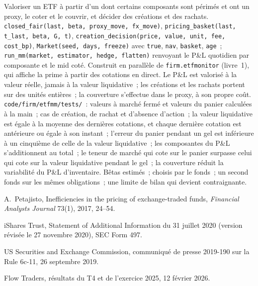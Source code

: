 \begin{build}
 Valoriser un ETF à partir d'un  dont certains composants sont périmés et ont un proxy, le coter et le couvrir, et décider des créations et des rachats.
 \texttt{closed\_fair(last, beta, proxy\_move, fx\_move)}, \texttt{pricing\_basket(last, t\_last, beta, G, t)},
\texttt{creation\_decision(price, value, unit, fee, cost\_bp)}, \texttt{Market(seed, days, freeze)} avec \texttt{true}, \texttt{nav},
\texttt{basket}, \texttt{age}~; \texttt{run\_mm(market, estimator, hedge, flatten)} renvoyant le P\&L quotidien par composante et le mid coté. Construit
en parallèle de \texttt{firm.etfmonitor} (livre~1), qui affiche la prime à partir des cotations en direct.
 Le P\&L est valorisé à la valeur réelle, jamais à la valeur liquidative~; les créations et les rachats portent sur des unités entières~; la couverture s'effectue dans le
proxy, à son propre coût.
 \texttt{code/firm/etfmm/tests/}~: valeurs à marché fermé et valeurs du panier calculées à la main~; cas de création, de rachat et d'absence d'action~; la valeur liquidative
est égale à la moyenne des dernières cotations, et chaque dernière cotation est antérieure ou égale à son instant~; l'erreur du panier pendant un gel est inférieure à un cinquième de celle de la
valeur liquidative~; les composantes du P\&L s'additionnent au total~; le teneur de marché qui cote sur le panier surpasse celui qui cote sur la valeur liquidative pendant le gel~; la couverture réduit la
variabilité du P\&L d'inventaire.
 Bêtas estimés~;  choisis par le fonds~; un second fonds sur les mêmes obligations~; une limite de bilan qui devient contraignante.
\end{build}

\begin{omsources}
\item A.~Petajisto, Inefficiencies in the pricing of exchange-traded funds, \emph{Financial Analysts Journal} 73(1), 2017, 24--54.
\item iShares Trust, Statement of Additional Information du 31 juillet 2020 (version révisée le 27 novembre 2020), SEC Form 497.
\item US Securities and Exchange Commission, communiqué de presse 2019-190 sur la Rule 6c-11, 26 septembre 2019.
\item Flow Traders, résultats du T4 et de l'exercice 2025, 12 février 2026.
\end{omsources}

